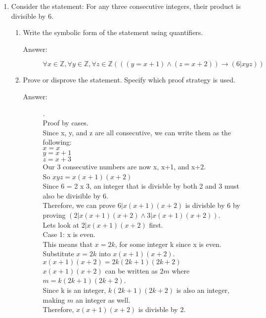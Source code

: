 \documentclass[12pt, oneside]{article}
\begin{document}
\begin{enumerate}
\item Consider the statement: For any three consecutive integers, their product is divisible by 6.
\begin{enumerate}
    \item Write the symbolic form of the statement using quantifiers.
    \begin{description}
        \item[Answer:] $\forall x \in \mathbb{Z} , \forall y \in \mathbb{Z} , \forall z \in \mathbb{Z} ( ((y=x+1) \land (z = x+2)) \rightarrow (6 | xyz) )$
    \end{description}
    \item Prove or disprove the statement. Specify which proof strategy is used.
    \begin{description}
        \item[Answer:] .\\
        Proof by cases. \\
        Since x, y, and z are all consecutive, we can write them as the following: \\
        $x = x$ \\
        $y = x+1$ \\
        $z = x+3$ \\
        Our 3 consecutive numbers are now x, x+1, and x+2. \\
        So $xyz = x(x+1)(x+2)$ \\
        Since 6 = 2 x 3, an integer that is divisble by both 2 and 3 must also be divisible by 6. \\
        Therefore, we can prove $6|x(x+1)(x+2)$ is divisble by 6 by proving $(2|x(x+1)(x+2) \land 3|x(x+1)(x+2))$. \\
        
        Lets look at $2|x(x+1)(x+2)$ first.\\
        
        Case 1: x is even. \\
        This means that $x=2k$, for some integer k since x is even. \\
        Substitute $x=2k$ into $x(x+1)(x+2)$. \\
        $x(x+1)(x+2) = 2k(2k+1)(2k+2)$ \\
        $x(x+1)(x+2)$ can be written as $2m$ where $m = k(2k+1)(2k+2)$. \\
        Since k is an integer, $k(2k+1)(2k+2)$ is also an integer, making $m$ an integer as well. \\
        Therefore, $x(x+1)(x+2)$ is divisble by 2. \\
        

\end{description}
\end{enumerate}
\end{enumerate}
\end{document}
